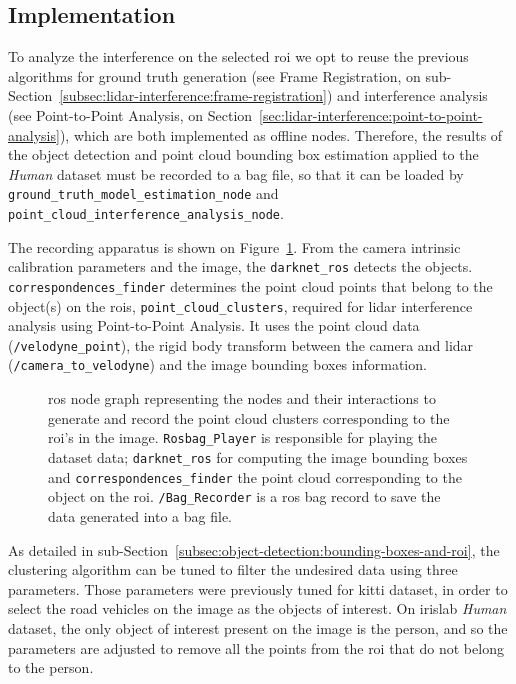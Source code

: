 \subsection{Implementation}
\label{subsec:lidar-interference:roi-implementation}
To analyze the interference on the selected \ac{roi} we opt to reuse the previous algorithms for ground truth generation (see Frame Registration, on sub-Section~\ref{subsec:lidar-interference:frame-registration}) and interference analysis (see Point-to-Point Analysis, on Section~\ref{sec:lidar-interference:point-to-point-analysis}), which are both implemented as offline nodes. Therefore, the results of the object detection and point cloud bounding box estimation applied to the \textit{Human} dataset must be recorded to a bag file, so that it can be loaded by \texttt{ground\_truth\_model\_estimation\_node} and \texttt{point\_cloud\_interference\_analysis\_node}.

The recording apparatus is shown on Figure~\ref{fig:human-roi-generation}. From the camera intrinsic calibration parameters and the image, the \texttt{darknet\_ros} detects the objects. \texttt{correspondences\_finder} determines the point cloud points that belong to the object(s) on the \acp{roi}, \texttt{point\_cloud\_clusters}, required for \ac{lidar} interference analysis using Point-to-Point Analysis. It uses the point cloud data (\texttt{/velodyne\_point}), the rigid body transform between the camera and \ac{lidar} (\texttt{/camera\_to\_velodyne}) and the image bounding boxes information.


\begin{figure}[!ht]
	\centering
	\def\svgwidth{\columnwidth}
	\graphicspath{{img/lidar-interference/human/}}
	
	\caption[\ac{ros} node graph to implement the \acp{roi} recording for later analysis.]{\ac{ros} node graph representing the nodes and their interactions to generate and record the point cloud clusters corresponding to the \ac{roi}'s in the image. \texttt{Rosbag\_Player} is responsible for playing the dataset data; \texttt{darknet\_ros} for computing the image bounding boxes and \texttt{correspondences\_finder} the point cloud corresponding to the object on the \ac{roi}. \texttt{/Bag\_Recorder} is a \ac{ros} bag record to save the data generated into a bag file.}
	\label{fig:human-roi-generation}
\end{figure}

As detailed in sub-Section~\ref{subsec:object-detection:bounding-boxes-and-roi}, the clustering algorithm can be tuned to filter the undesired data using three parameters. Those parameters were previously tuned for \ac{kitti} dataset, in order to select the road vehicles on the image as the objects of interest. On \ac{irislab} \textit{Human} dataset, the only object of interest present on the image is the person, and so the parameters are adjusted to remove all the points from the \ac{roi} that do not belong to the person. 

